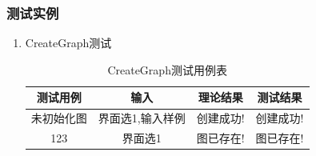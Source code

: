 \documentclass[supercite]{HustGraduPaper}
\theoremstyle{definition}
\begin{document}
\subsubsection{测试实例}
\begin{enumerate}
	\item CreateGraph测试
	      \begin{table}[htb]
		      \begin{center}
			      \setlength{\tabcolsep}{2.0mm}
			      \caption{CreateGraph测试用例表}
			      \label{t1}
			      \begin{tabular}{|c|c|c|c|}
				      \hline
				      测试用例   & 输入             & 理论结果  & 测试结果  \\
				      \hline
				      \hline
				      未初始化图 & 界面选1,输入样例 & 创建成功! & 创建成功! \\
				      \hline
				      123        & 界面选1          & 图已存在! & 图已存在! \\
				      \hline
			      \end{tabular}
		      \end{center}
	      \end{table}
	      \begin{figure}[htb]
		      \centering
		      \quad
		      \\

\end{figure}
\end{enumerate}
\end{document}
